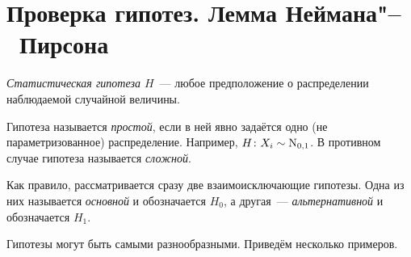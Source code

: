 \section{Проверка гипотез. Лемма Неймана"--~Пирсона}

\begin{defn}
    \textit{Статистическая гипотеза $H$}~--- любое предположение о распределении наблюдаемой случайной величины.
    
    Гипотеза называется \textit{простой}, если в ней явно задаётся одно (не параметризованное) распределение. 
    Например, $H\colon X_i \sim \operatorname{\mathrm{N}}_{0, 1}$. 
    В противном случае гипотеза называется \textit{сложной}.

    Как правило, рассматривается сразу две взаимоисключающие гипотезы.
    Одна из них называется \textit{основной} и обозначается $H_0$, а другая~--- \textit{альтернативной} и обозначается $H_1$.
\end{defn}

Гипотезы могут быть самыми разнообразными.
Приведём несколько примеров.

